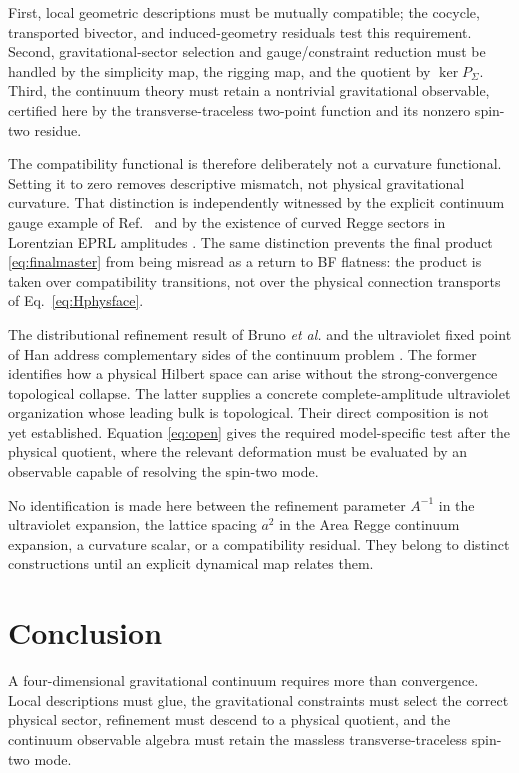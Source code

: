 \documentclass[aps,prd,reprint,nofootinbib,superscriptaddress]{revtex4-2}
\begin{document}
First, local geometric descriptions must be mutually compatible; the cocycle, transported bivector, and induced-geometry residuals test this requirement. Second, gravitational-sector selection and gauge/constraint reduction must be handled by the simplicity map, the rigging map, and the quotient by $\ker P_\Sigma$. Third, the continuum theory must retain a nontrivial gravitational observable, certified here by the transverse-traceless two-point function and its nonzero spin-two residue.

The compatibility functional is therefore deliberately not a curvature functional. Setting it to zero removes descriptive mismatch, not physical gravitational curvature. That distinction is independently witnessed by the explicit continuum gauge example of Ref.~\cite{CoppaMotionDifference2026} and by the existence of curved Regge sectors in Lorentzian EPRL amplitudes \cite{HanEtAl2022}. The same distinction prevents the final product \eqref{eq:finalmaster} from being misread as a return to BF flatness: the product is taken over compatibility transitions, not over the physical connection transports of Eq.~\eqref{eq:Hphysface}.

The distributional refinement result of Bruno \emph{et al.} and the ultraviolet fixed point of Han address complementary sides of the continuum problem \cite{BrunoEtAl2026,Han2026}. The former identifies how a physical Hilbert space can arise without the strong-convergence topological collapse. The latter supplies a concrete complete-amplitude ultraviolet organization whose leading bulk is topological. Their direct composition is not yet established. Equation \eqref{eq:open} gives the required model-specific test after the physical quotient, where the relevant deformation must be evaluated by an observable capable of resolving the spin-two mode.

No identification is made here between the refinement parameter $A^{-1}$ in the ultraviolet expansion, the lattice spacing $a^2$ in the Area Regge continuum expansion, a curvature scalar, or a compatibility residual. They belong to distinct constructions until an explicit dynamical map relates them.

\section{Conclusion}

A four-dimensional gravitational continuum requires more than convergence. Local descriptions must glue, the gravitational constraints must select the correct physical sector, refinement must descend to a physical quotient, and the continuum observable algebra must retain the massless transverse-traceless spin-two mode.
\end{document}
